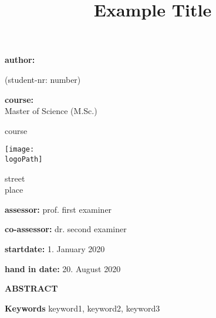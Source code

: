 \documentclass[
	english,
	letterpaper,
	12pt
]{scrartcl}
\title{Example Title}
\author{\censor{censored name}}
\date{}
\makeatletter
\newcommand{\logoPath}{data/campus_logo}}{%
\newcommand{\logoPath}{data/campus_logo_bk}}
\newcommand{\matrikelnr}{number}
\newcommand{\degree}{Master of Science (M.Sc.)}
\newcommand{\course}{course}
\newcommand{\firstexaminer}{prof. first examiner}
\newcommand{\secondexaminer}{dr. second examiner}
\newcommand{\startdate}{1. January 2020}
\newcommand{\finishdate}{20. August 2020}
\newcommand{\university}{\texttt{[image: \\logoPath]}}
\newcommand{\uniaddress}{street\\ place}
\newcommand{\runkeywords}{keyword1, keyword2, keyword3}
\let\runtitle\@title
\let\runauthor\@author
\makeatother
\begin{document}
	\onehalfspacing
	\begin{titlepage}
	{\centering
		{\Large\textbf{\runtitle}\par}
		\vspace{0.5cm}
		{\textbf{author:} \\ \runauthor \par}
		{(student-nr: \matrikelnr)\par}
		\vspace{0.5cm}
		{\textbf{course:} \\ \degree\par \course\par}
		\vspace{0.5cm}
		{\university\par}
		{\uniaddress} \\
		\vspace{0.5cm}
		{\textbf{assessor:} \firstexaminer\par}
		{\textbf{co-assessor:} \secondexaminer\par}
		
		\vspace{0.5cm}
		
		{\textbf{startdate:} \startdate\par}
		{\textbf{hand in date:} \finishdate\par}
		
		\vspace{1cm}
		
		{\Large \textbf{ABSTRACT}\par}
		\vspace{0.25cm}
	}
	    
		\vfill
		\textbf{Keywords} \runkeywords 
	\end{titlepage} 
	\setcounter{page}{1}
	
\newpage
	\setcounter{page}{1}
	
	
	\newpage

	
	
	\newpage
	\printbibliography

	\newpage
	\appendix\setlength{\parindent}{0cm}
		\clearpage
		\processdelayedfloats
		\clearpage
\end{document}
